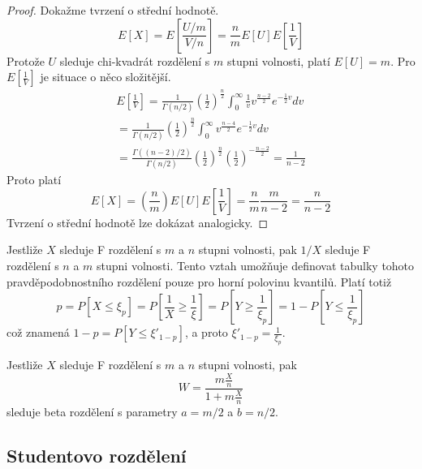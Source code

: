 \begin{proof}
Dokažme tvrzení o střední hodnotě.
\begin{equation*}
E[X] = E \left[\frac{U/m}{V/n}\right] = \frac{n}{m}E[U]E\left[\frac{1}{V}\right]
\end{equation*}
Protože $U$ sleduje chi-kvadrát rozdělení s $m$ stupni volnosti, platí $E[U] = m$. Pro $E \left[\frac{1}{V} \right]$ je situace o něco složitější.
\begin{gather*}
E \left[\frac{1}{V}\right] = \frac{1}{\Gamma(n/2)}\left(\frac{1}{2}\right)^{\frac{n}{2}}\int_0^{\infty} \frac{1}{v} v^{\frac{n-2}{2}}e^{-\frac{1}{2}v}dv\\
= \frac{1}{\Gamma(n/2)}\left(\frac{1}{2}\right)^{\frac{n}{2}}\int_0^{\infty} v^{\frac{n - 4}{2}}e^{-\frac{1}{2}v}dv\\
= \frac{\Gamma((n - 2) / 2)}{\Gamma(n / 2)}\left(\frac{1}{2}\right)^{\frac{n}{2}}\left(\frac{1}{2}\right)^{-\frac{n-2}{2}} = \frac{1}{n - 2}
\end{gather*}
Proto platí
\begin{equation*}
E[X] = \left(\frac{n}{m}\right)E[U]E\left[\frac{1}{V}\right] = \frac{n}{m}\frac{m}{n - 2} = \frac{n}{n - 2}
\end{equation*}
Tvrzení o střední hodnotě lze dokázat analogicky.
\end{proof}

Jestliže $X$ sleduje F rozdělení s $m$ a $n$ stupni volnosti, pak $1/X$ sleduje F rozdělení s $n$ a $m$ stupni volnosti. Tento vztah umožňuje definovat tabulky tohoto pravděpodobnostního rozdělení pouze pro horní polovinu kvantilů. Platí totiž
\begin{equation*}
p = P[X \le \xi_p] = P \left[\frac{1}{X} \ge \frac{1}{\xi} \right] = P \left[Y \ge \frac{1}{\xi_p} \right] = 1 - P\left[Y \le \frac{1}{\xi_p} \right]
\end{equation*}
což znamená $1 - p = P[Y \le \xi'_{1 - p}]$, a proto $\xi'_{1 - p} = \frac{1}{\xi_p}$.

Jestliže $X$ sleduje F rozdělení s $m$ a $n$ stupni volnosti, pak
\begin{equation*}
W = \frac{m \frac{X}{n}}{1 + m \frac{X}{n}}
\end{equation*}
sleduje beta rozdělení s parametry $a = m/2$ a $b = n/2$.
 
\subsection{Studentovo rozdělení}

